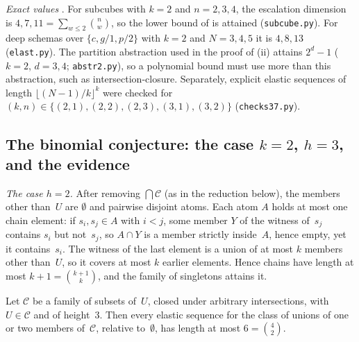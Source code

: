 \emph{Exact values} . For subcubes with $k=2$ and $n=2,3,4$, the escalation dimension is $4,7,11=\sum_{w\le2}\binom nw$, so the lower bound of  is attained (\texttt{subcube.py}). For deep schemas over $\{c,g/1,p/2\}$ with $k=2$ and $N=3,4,5$ it is $4,8,13$ (\texttt{elast.py}). The partition abstraction used in the proof of (ii) attains $2^d-1$ ($k=2$, $d=3,4$; \texttt{abstr2.py}), so a polynomial bound must use more than this abstraction, such as intersection-closure. Separately, explicit elastic sequences of length $\lfloor(N-1)/k\rfloor^k$ were checked for $(k,n)\in\{(2,1),(2,2),(2,3),(3,1),(3,2)\}$ (\texttt{checks37.py}).

\subsection{The binomial conjecture: the case \texorpdfstring{$k=2$, $h=3$}{k=2, h=3}, and the evidence}\label{app:caution:conj}

\emph{The case $h=2$.} After removing $\bigcap\mathcal C$ (as in the reduction below), the members other than~$U$ are $\emptyset$ and pairwise disjoint atoms. Each atom $A$ holds at most one chain element: if $s_i,s_j\in A$ with $i<j$, some member $Y$ of the witness of~$s_j$ contains $s_i$ but not~$s_j$, so $A\cap Y$ is a member strictly inside~$A$, hence empty, yet it contains~$s_i$. The witness of the last element is a union of at most $k$ members other than~$U$, so it covers at most $k$ earlier elements. Hence chains have length at most $k+1=\binom{k+1}{k}$, and the family of singletons attains it.

\begin{proposition}[\Cref{conj:caution:binomial} for $(k,h)=(2,3)$]\label{prop:app:caution:conj23}
Let $\mathcal C$ be a family of subsets of~$U$, closed under arbitrary intersections, with $U\in\mathcal C$ and of height~$3$. Then every elastic sequence for the class of unions of one or two members of~$\mathcal C$, relative to~$\emptyset$, has length at most $6=\binom42$.
\end{proposition}

